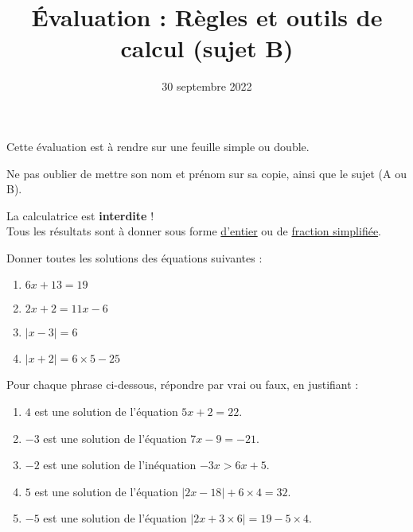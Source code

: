 \documentclass[
	classe=$2^{de}$,
	headerTitle=Évaluation\space Chapitre\space 1,
	surFeuille
]{évaluation}
\title{Évaluation : Règles et outils de calcul (sujet B)}
\date{30 septembre 2022}
\begin{document}
\maketitle

\begin{tcolorbox}
	Cette évaluation est à rendre sur une feuille simple ou double.

	Ne pas oublier de mettre son nom et prénom sur sa copie, ainsi que le sujet (A ou B).

	La calculatrice est \textbf{interdite} ! \\

	Tous les résultats sont à donner sous forme \uline{d'entier} ou de \uline{fraction simplifiée}.
\end{tcolorbox}

\begin{exercice}
	Donner toutes les solutions des équations suivantes :
	\begin{multicols}{2}
		\begin{enumerate}
			\item $6x + 13 = 19$
			\item $2x + 2 = 11x - 6$
			\item $|x - 3| = 6$
			\item $|x + 2| = 6 × 5 - 25$
		\end{enumerate}
	\end{multicols}
\end{exercice}

\begin{exercice}
	Pour chaque phrase ci-dessous, répondre par vrai ou faux, en justifiant :
	\begin{enumerate}
		\item $4$ est une solution de l'équation $5x + 2 = 22$.
		\item $-3$ est une solution de l'équation $7x - 9 = -21$.
		\item $-2$ est une solution de l'inéquation $-3x > 6x + 5$.
		\item $5$ est une solution de l'équation $|2x - 18| + 6 × 4 = 32$.
		\item $-5$ est une solution de l'équation $|2x + 3 × 6| = 19 - 5 × 4$.
	\end{enumerate}
\end{exercice}
\end{document}
